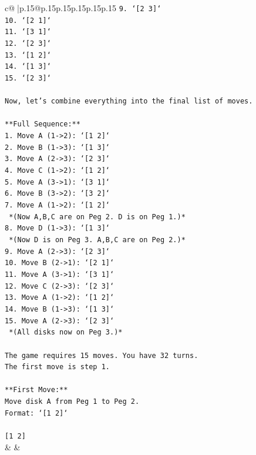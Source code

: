 \documentclass{article}
\begin{document}
{\begin{supertabular}{c@{$\;$}|p{.15\linewidth}@{}p{.15\linewidth}p{.15\linewidth}p{.15\linewidth}p{.15\linewidth}p{.15\linewidth}}
{{{\texttt{9. `{[}2 3{]}`} \\
\texttt{10. `{[}2 1{]}`} \\
\texttt{11. `{[}3 1{]}`} \\
\texttt{12. `{[}2 3{]}`} \\
\texttt{13. `{[}1 2{]}`} \\
\texttt{14. `{[}1 3{]}`} \\
\texttt{15. `{[}2 3{]}`} \\
\\ 
\texttt{Now, let's combine everything into the final list of moves.} \\
\\ 
\texttt{**Full Sequence:**} \\
\texttt{1. Move A (1{-}>2): `{[}1 2{]}`} \\
\texttt{2. Move B (1{-}>3): `{[}1 3{]}`} \\
\texttt{3. Move A (2{-}>3): `{[}2 3{]}`} \\
\texttt{4. Move C (1{-}>2): `{[}1 2{]}`} \\
\texttt{5. Move A (3{-}>1): `{[}3 1{]}`} \\
\texttt{6. Move B (3{-}>2): `{[}3 2{]}`} \\
\texttt{7. Move A (1{-}>2): `{[}1 2{]}`} \\
\texttt{   *(Now A,B,C are on Peg 2. D is on Peg 1.)*} \\
\texttt{8. Move D (1{-}>3): `{[}1 3{]}`} \\
\texttt{   *(Now D is on Peg 3. A,B,C are on Peg 2.)*} \\
\texttt{9. Move A (2{-}>3): `{[}2 3{]}`} \\
\texttt{10. Move B (2{-}>1): `{[}2 1{]}`} \\
\texttt{11. Move A (3{-}>1): `{[}3 1{]}`} \\
\texttt{12. Move C (2{-}>3): `{[}2 3{]}`} \\
\texttt{13. Move A (1{-}>2): `{[}1 2{]}`} \\
\texttt{14. Move B (1{-}>3): `{[}1 3{]}`} \\
\texttt{15. Move A (2{-}>3): `{[}2 3{]}`} \\
\texttt{   *(All disks now on Peg 3.)*} \\
\\ 
\texttt{The game requires 15 moves. You have 32 turns.} \\
\texttt{The first move is step 1.} \\
\\ 
\texttt{**First Move:**} \\
\texttt{Move disk A from Peg 1 to Peg 2.} \\
\texttt{Format: `{[}1 2{]}`} \\
\\ 
\texttt{{[}1 2{]}} \\
            }
        }
    }
    & & \\ \\


\end{supertabular}}
\end{document}
